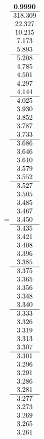 =\hbox{$\begin{array}{c}
\bf 0.9990 
 \\ \hline 
 318.309 \\ 
  22.327 \\ 
  10.215 \\ 
   7.173 \\ 
   5.893
 \\ \hline 
   5.208 \\ 
   4.785 \\ 
   4.501 \\ 
   4.297 \\ 
   4.144
 \\ \hline 
   4.025 \\ 
   3.930 \\ 
   3.852 \\ 
   3.787 \\ 
   3.733
 \\ \hline 
   3.686 \\ 
   3.646 \\ 
   3.610 \\ 
   3.579 \\ 
   3.552
 \\ \hline 
   3.527 \\ 
   3.505 \\ 
   3.485 \\ 
   3.467 \\ 
   3.450
 \\ \hline 
   3.435 \\ 
   3.421 \\ 
   3.408 \\ 
   3.396 \\ 
   3.385
 \\ \hline 
   3.375 \\ 
   3.365 \\ 
   3.356 \\ 
   3.348 \\ 
   3.340
 \\ \hline 
   3.333 \\ 
   3.326 \\ 
   3.319 \\ 
   3.313 \\ 
   3.307
 \\ \hline 
   3.301 \\ 
   3.296 \\ 
   3.291 \\ 
   3.286 \\ 
   3.281
 \\ \hline 
   3.277 \\ 
   3.273 \\ 
   3.269 \\ 
   3.265 \\ 
   3.261
 \end{array}$}
